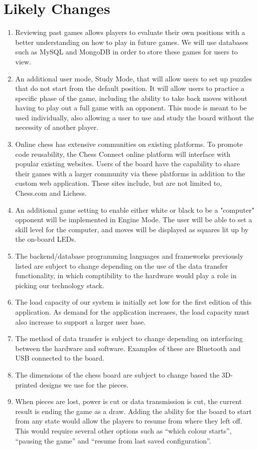 \documentclass[12pt]{article}
\begin{document}
{\section{Likely Changes}
\noindent
\begin{enumerate}[{LC}1., leftmargin=2\parindent]
    \item Reviewing past games allows players to evaluate their own positions with a better understanding on how to play in future games.
    We will use databases such as MySQL and MongoDB in order to store these games for users to view.
    \item An additional user mode, Study Mode, that will allow users to set up puzzles that do not start from the default position.
    It will allow users to practice a specific phase of the game, including the ability to take back moves without having to play out a full game with an opponent. 
    This mode is meant to be used individually, also allowing a user to use and study the board without the necessity of another player.
    \item Online chess has extensive communities on existing platforms. To promote code reusability, the Chess Connect online platform will interface with popular existing websites.
    Users of the board have the capability to share their games with a larger community via these platforms in addition to the custom web application. These sites include, but are not limited to, Chess.com and Lichess.
    \item An additional game setting to enable either white or black to be a "computer" opponent will be implemented in Engine Mode. The user will be able to set a skill level
    for the computer, and moves will be displayed as squares lit up by the on-board LEDs.
    \item The backend/database programming languages and frameworks previously listed
    are subject to change depending on the use of the data transfer functionality, in which comptibility to the hardware would play a role
    in picking our technology stack.  
    \item The load capacity of our system is initially set low for the
    first edition of this application. As demand for the application increases, the load capacity must also increase to support a
    larger user base.
    \item The method of data transfer is subject to change depending on
    interfacing between the hardware and software. Examples of these are Bluetooth and USB connected to the board.
    \item The dimensions of the chess board are subject to change based
    the 3D-printed designs we use for the pieces. 
    \item When pieces are lost, power is cut or data transmission is cut, the current result is ending the game as a draw. Adding the ability for the board to start from any state
    would allow the players to resume from where they left off. This would require several other options such as ``which colour starts'', ``pausing the game'' and ``resume from
    last saved configuration''.
\end{enumerate}
  
}
\end{document}
